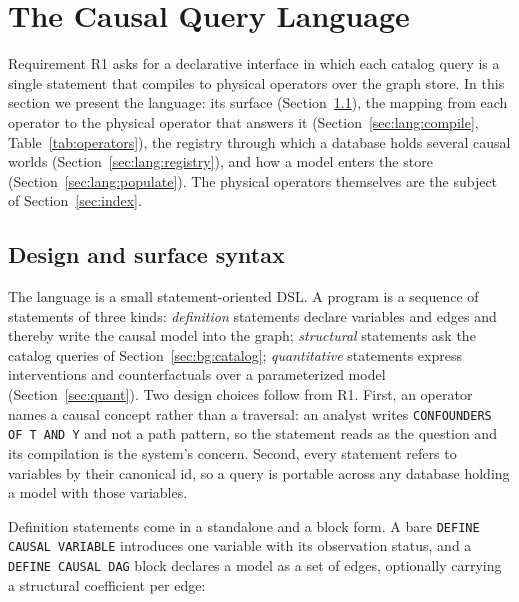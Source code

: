 \section{The Causal Query Language}\label{sec:lang}

Requirement R1 asks for a declarative interface in which each catalog query is
a single statement that compiles to physical operators over the graph store.
In this section we present the language: its surface
(Section~\ref{sec:lang:surface}), the mapping from each operator to the
physical operator that answers it (Section~\ref{sec:lang:compile},
Table~\ref{tab:operators}), the registry through which a database holds
several causal worlds (Section~\ref{sec:lang:registry}), and how a model
enters the store (Section~\ref{sec:lang:populate}). The physical operators
themselves are the subject of Section~\ref{sec:index}.

\subsection{Design and surface syntax}\label{sec:lang:surface}

The language is a small statement-oriented DSL. A program is a sequence of
statements of three kinds: \textit{definition} statements declare variables
and edges and thereby write the causal model into the graph;
\textit{structural} statements ask the catalog queries of
Section~\ref{sec:bg:catalog}; \textit{quantitative} statements express
interventions and counterfactuals over a parameterized model
(Section~\ref{sec:quant}). Two design choices follow from R1. First, an
operator names a causal concept rather than a traversal: an analyst writes
\lstinline[style=causaldsl]|CONFOUNDERS OF T AND Y| and not a path pattern, so
the statement reads as the question and its compilation is the system's
concern. Second, every statement refers to variables by their canonical
\textsf{id}, so a query is portable across any database holding a model with
those variables.

Definition statements come in a standalone and a block form. A bare
\lstinline[style=causaldsl]|DEFINE CAUSAL VARIABLE| introduces one variable
with its observation status, and a
\lstinline[style=causaldsl]|DEFINE CAUSAL DAG| block declares a model as a
set of edges, optionally carrying a structural coefficient per edge:

